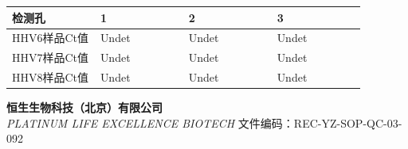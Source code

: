 \documentclass[UTF8,10pt,a4paper,fontset=fandol]{ctexart}
\newcommand{\fieldvalue}[1]{#1}
\newcommand{\handwritten}[1]{#1}
\begin{document}
\begin{tabular}{|p{0.22\linewidth}|p{0.22\linewidth}|p{0.22\linewidth}|p{0.22\linewidth}|}
\hline
检测孔 & 1 & 2 & 3 \\ \hline
HHV6样品Ct值 &
\fieldvalue{\handwritten{Undet}} &
\fieldvalue{\handwritten{Undet}} &
\fieldvalue{\handwritten{Undet}} \\ \hline
HHV7样品Ct值 &
\fieldvalue{\handwritten{Undet}} &
\fieldvalue{\handwritten{Undet}} &
\fieldvalue{\handwritten{Undet}} \\ \hline
HHV8样品Ct值 &
\fieldvalue{\handwritten{Undet}} &
\fieldvalue{\handwritten{Undet}} &
\fieldvalue{\handwritten{Undet}} \\ \hline
\end{tabular}

\newpage

\begin{center}
\small
\textbf{恒生生物科技（北京）有限公司}\\
\textit{PLATINUM LIFE EXCELLENCE BIOTECH}\hspace{2cm}
文件编码：REC-YZ-SOP-QC-03-092
\end{center}
\end{document}
